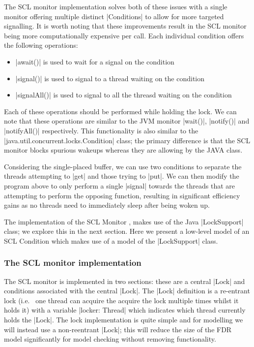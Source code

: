 The SCL monitor implementation solves both of these issues with a single monitor offering multiple distinct |Conditions| to allow for more targeted signalling. It is worth noting that these improvements result in the SCL monitor being more computationally expensive per call. Each individual condition offers the following operations:
\begin{itemize}
  \item |await()| is used to wait for a signal on the condition
  \item |signal()| is used to signal to a thread waiting on the condition
  \item |signalAll()| is used to signal to all the threasd waiting on the condition
\end{itemize}
Each of these operations should be performed while holding the lock. We can note that these operations are similar to the JVM monitor |wait()|, |notify()| and |notifyAll()| respectively. This functionality is also similar to the |java.util.concurrent.locks.Condition| class; the primary difference is that the SCL monitor blocks spurious wakeups whereas they are allowing by the JAVA class.

Considering the single-placed buffer, we can use two conditions to separate the threads attempting to |get| and those trying to |put|. We can then modify the program above to only perform a single |signal| towards the threads that are attempting to perform the opposing function, resulting in significant efficiency gains as no threads need to immediately sleep after being woken up.

The implementation of the SCL Monitor \cite{GitHub}, makes use of the Java |LockSupport| class; we explore this in the next section. Here we present a low-level model of an SCL Condition which makes use of a model of the |LockSupport| class.

\subsubsection{The SCL monitor implementation}

The SCL monitor is implemented in two sections: these are a central |Lock| and conditions associated with the central |Lock|. The |Lock| definition is a re-entrant lock (i.e.~ one thread can acquire the acquire the lock multiple times whilst it holds it) with a variable |locker: Thread| which indicates which thread currently holds the |Lock|. The lock implementation is quite simple and for modelling we will instead use a non-reentrant |Lock|; this will reduce the size of the FDR model significantly for model checking without removing functionality.

